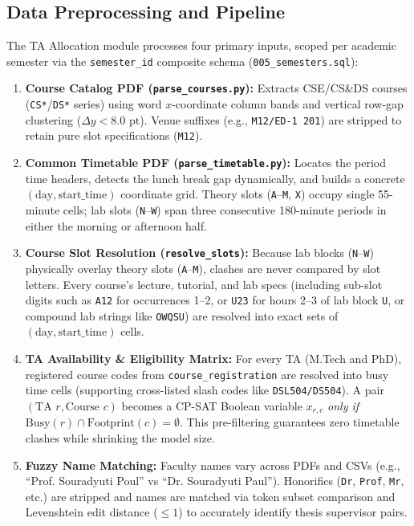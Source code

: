 \documentclass[12pt,a4paper]{article}
\begin{document}
\subsection{Data Preprocessing and Pipeline}
The TA Allocation module processes four primary inputs, scoped per academic semester via the \texttt{semester\_id} composite schema (\texttt{005\_semesters.sql}):

\begin{enumerate}[leftmargin=*]
    \item \textbf{Course Catalog PDF (\texttt{parse\_courses.py}):} Extracts CSE/CS\&DS courses (\texttt{CS*}/\texttt{DS*} series) using word $x$-coordinate column bands and vertical row-gap clustering ($\Delta y < 8.0\text{ pt}$). Venue suffixes (e.g., \texttt{M12/ED-1 201}) are stripped to retain pure slot specifications (\texttt{M12}).
    \item \textbf{Common Timetable PDF (\texttt{parse\_timetable.py}):} Locates the period time headers, detects the lunch break gap dynamically, and builds a concrete $(\text{day}, \text{start\_time})$ coordinate grid. Theory slots (\texttt{A}--\texttt{M}, \texttt{X}) occupy single 55-minute cells; lab slots (\texttt{N}--\texttt{W}) span three consecutive 180-minute periods in either the morning or afternoon half.
    \item \textbf{Course Slot Resolution (\texttt{resolve\_slots}):} Because lab blocks (\texttt{N}--\texttt{W}) physically overlay theory slots (\texttt{A}--\texttt{M}), clashes are never compared by slot letters. Every course's lecture, tutorial, and lab specs (including sub-slot digits such as \texttt{A12} for occurrences 1--2, or \texttt{U23} for hours 2--3 of lab block \texttt{U}, or compound lab strings like \texttt{OWQSU}) are resolved into exact sets of $(\text{day}, \text{start\_time})$ cells.
    \item \textbf{TA Availability \& Eligibility Matrix:} For every TA (M.Tech and PhD), registered course codes from \texttt{course\_registration} are resolved into busy time cells (supporting cross-listed slash codes like \texttt{DSL504/DS504}). A pair $(\text{TA } r, \text{Course } c)$ becomes a CP-SAT Boolean variable $x_{r,c}$ \textit{only if} $\text{Busy}(r) \cap \text{Footprint}(c) = \emptyset$. This pre-filtering guarantees zero timetable clashes while shrinking the model size.
    \item \textbf{Fuzzy Name Matching:} Faculty names vary across PDFs and CSVs (e.g., ``Prof. Souradyuti Poul'' vs ``Dr. Souradyuti Paul''). Honorifics (\texttt{Dr}, \texttt{Prof}, \texttt{Mr}, etc.) are stripped and names are matched via token subset comparison and Levenshtein edit distance ($\le 1$) to accurately identify thesis supervisor pairs.
\end{enumerate}
\end{document}
